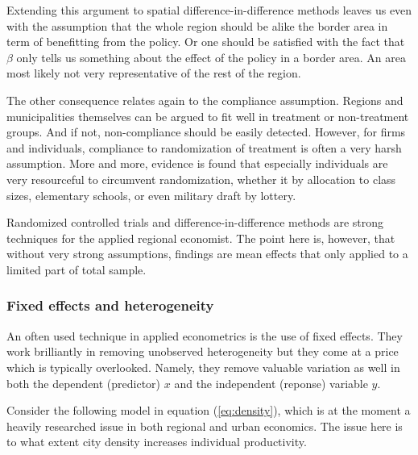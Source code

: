 \documentclass[fleqn,10pt]{SelfArx} %
\begin{document}
Extending this argument to spatial difference-in-difference methods leaves us
even with the assumption that the whole region should be alike the border area
in term of benefitting from the policy. Or one should be satisfied with the fact
that $\beta$ only tells us something about the effect of the policy in a border
area. An area most likely not very representative of the rest of the region. 

The other consequence relates again to the compliance assumption. Regions and
municipalities themselves can be argued to fit well in treatment or
non-treatment groups. And if not, non-compliance should be easily detected.
However, for firms and individuals, compliance to randomization
of treatment is often a very harsh assumption. More and more, evidence is found
that especially individuals are very resourceful to circumvent randomization,
whether it by allocation to class sizes, elementary schools, or even military
draft by lottery.

Randomized controlled trials and difference-in-difference methods are strong
techniques for the applied regional economist. The point here is, however, that
without very strong assumptions, findings are mean effects that only applied to
a limited part of total sample. 

\subsubsection{Fixed effects and heterogeneity}

An often used technique in applied econometrics is the use of fixed effects.
They work brilliantly in removing unobserved heterogeneity but they come at a
price which is typically overlooked. Namely, they remove valuable variation as well in
both the dependent (predictor) $x$ and the independent (reponse) variable $y$.

Consider the following model in equation (\ref{eq:density}), which is at the moment a heavily
researched issue in both regional and urban economics. The issue here is to what
extent city density increases individual productivity.  
\end{document}
